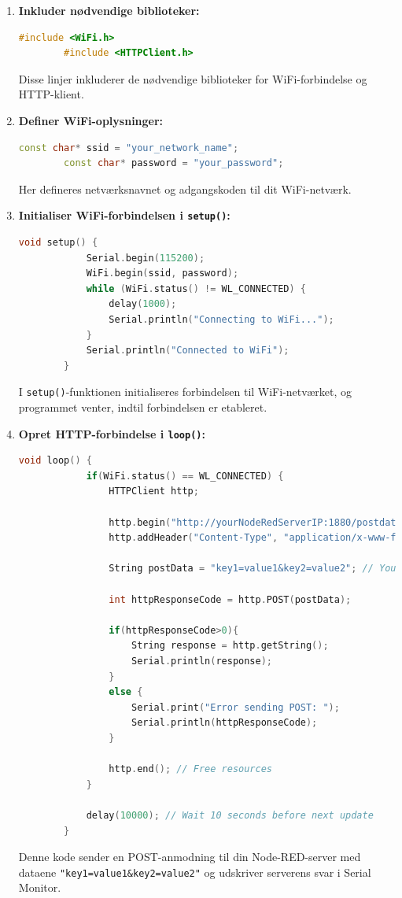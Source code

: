 \begin{enumerate}
	\item \textbf{Inkluder nødvendige biblioteker:}
	\begin{lstlisting}[language=C++, caption=Include necessary libraries]
		#include <WiFi.h>
		#include <HTTPClient.h>
	\end{lstlisting}
	Disse linjer inkluderer de nødvendige biblioteker for WiFi-forbindelse og HTTP-klient.
	
	\item \textbf{Definer WiFi-oplysninger:}
	\begin{lstlisting}[language=C++, caption=Define WiFi credentials]
		const char* ssid = "your_network_name";
		const char* password = "your_password";
	\end{lstlisting}
	Her defineres netværksnavnet og adgangskoden til dit WiFi-netværk.
	
	\item \textbf{Initialiser WiFi-forbindelsen i \texttt{setup()}:}
	\begin{lstlisting}[language=C++, caption=Initialize WiFi connection in setup()]
		void setup() {
			Serial.begin(115200);
			WiFi.begin(ssid, password);
			while (WiFi.status() != WL_CONNECTED) {
				delay(1000);
				Serial.println("Connecting to WiFi...");
			}
			Serial.println("Connected to WiFi");
		}
	\end{lstlisting}
	I \texttt{setup()}-funktionen initialiseres forbindelsen til WiFi-netværket, og programmet venter, indtil forbindelsen er etableret.
	
	\item \textbf{Opret HTTP-forbindelse i \texttt{loop()}:}
	\begin{lstlisting}[language=C++, caption=Create HTTP connection in loop()]
		void loop() {
			if(WiFi.status() == WL_CONNECTED) {
				HTTPClient http;
				
				http.begin("http://yourNodeRedServerIP:1880/postdata"); // Specify the URL
				http.addHeader("Content-Type", "application/x-www-form-urlencoded"); // Set content type
				
				String postData = "key1=value1&key2=value2"; // Your POST data
				
				int httpResponseCode = http.POST(postData);
				
				if(httpResponseCode>0){
					String response = http.getString();
					Serial.println(response);
				}
				else {
					Serial.print("Error sending POST: ");
					Serial.println(httpResponseCode);
				}
				
				http.end(); // Free resources
			}
			
			delay(10000); // Wait 10 seconds before next update
		}
	\end{lstlisting}
	Denne kode sender en POST-anmodning til din Node-RED-server med dataene \texttt{"key1=value1\&key2=value2"} og udskriver serverens svar i Serial Monitor.
\end{enumerate}

